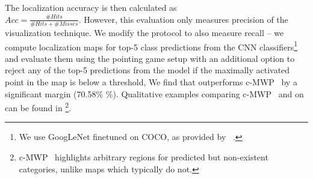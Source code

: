 The localization accuracy is then calculated as \\$Acc = \frac{\#Hits}{\#Hits+\#Misses}$.
However, this evaluation only measures precision of the visualization technique.
We modify the protocol to also measure recall --
we compute localization maps for top-5 class predictions from the
CNN classifiers\footnote{We use GoogLeNet finetuned on COCO, as provided by ~\cite{zhang2016top}.}
and evaluate them using the pointing game setup with an additional option to
reject any of the top-5 predictions from the model if the maximally activated
point in the map is below a threshold,
We find that \gcam{} outperforms c-MWP~\cite{zhang2016top} by a significant
margin (70.58\% \%).
Qualitative examples comparing c-MWP~\cite{zhang2016top} and \gcam{} on %
can be found in \footnote{
c-MWP~\cite{zhang2016top} highlights arbitrary regions for predicted but non-existent categories, unlike \gcam{} maps which typically do not.}.

